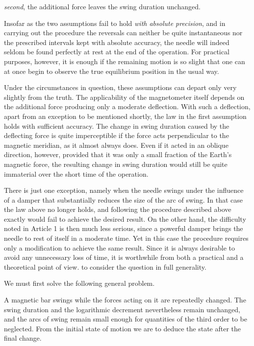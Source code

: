 \textit{second}, the additional force leaves the swing duration unchanged.

Insofar as the two assumptions fail to hold \textit{with absolute precision}, and in carrying out the procedure the reversals can neither be quite instantaneous nor the prescribed intervals kept with absolute accuracy, the needle will indeed seldom be found perfectly at rest at the end of the operation. For practical purposes, however, it is enough if the remaining motion is so slight that one can at once begin to observe the true equilibrium position in the usual way.

Under the circumstances in question, these assumptions can depart only very slightly from the truth. The applicability of the magnetometer itself depends on the additional force producing only a moderate deflection. With such a deflection, apart from an exception to be mentioned shortly, the law in the first assumption holds with sufficient accuracy. The change in swing duration caused by the deflecting force is quite imperceptible if the force acts perpendicular to the magnetic meridian, as it almost always does. Even if it acted in an oblique direction, however, provided that it was only a small fraction of the Earth’s magnetic force, the resulting change in swing duration would still be quite immaterial over the short time of the operation.

There is just one exception, namely when the needle swings under the influence of a damper that substantially reduces the size of the arc of swing. In that case the law above no longer holds, and following the procedure described above exactly would fail to achieve the desired result. On the other hand, the
difficulty noted in Article 1 is then much less serious, since a powerful damper brings the needle to rest of itself in a moderate time. Yet in this case the procedure requires only a modification to achieve the same result. Since it is always desirable to avoid any unnecessary loss of time, it is worthwhile from both a practical and a theoretical point of view. to consider the question in full generality.

We must first solve the following general problem.

A magnetic bar swings while the forces acting on it are repeatedly changed. The swing duration and the logarithmic decrement nevertheless remain unchanged, and the arcs of swing remain small enough for quantities of the third order to be neglected. From the initial state of motion we are to deduce the state after the final change.

